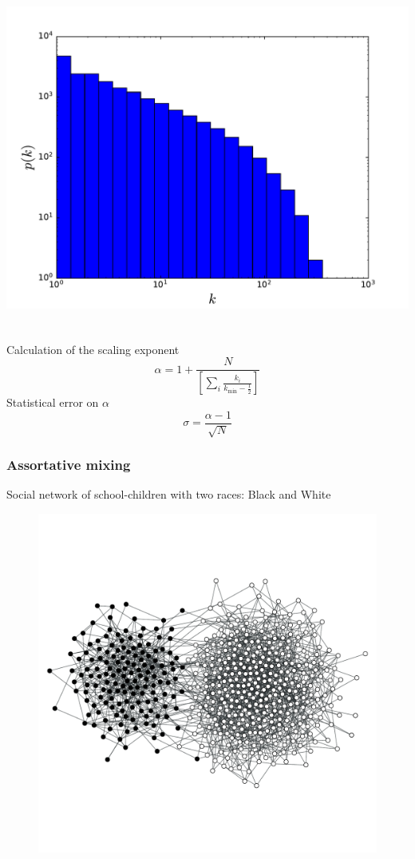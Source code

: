 \documentclass{beamer}
\begin{document}
\begin{frame}
\begin{columns}
        \includegraphics[width=\columnwidth]{deg_distri_global_airport_log_logbins_cumul.pdf}
    \end{columns}
\end{frame}
\begin{frame}
    \frametitle{}

    Calculation of the scaling exponent
    $$\alpha = 1 + \frac{N}{\left[\sum\limits_i\frac{k_i}{k_{\text{min}}-\frac{1}{2}}\right]}$$
    Statistical error on $\alpha$
    $$\sigma = \frac{\alpha-1}{\sqrt{N}}$$
\end{frame}
\begin{frame}
    \frametitle{Assortative mixing}
    \vspace{2em}
    \centering
    {\small Social network of school-children with two races: Black and White}
    \begin{figure}
        \begin{center}
        \includegraphics[width=0.8\columnwidth,trim=0 0 0 50,clip=true]{assort_network.pdf}
        \end{center}
    \end{figure}
\end{frame}
\end{document}
